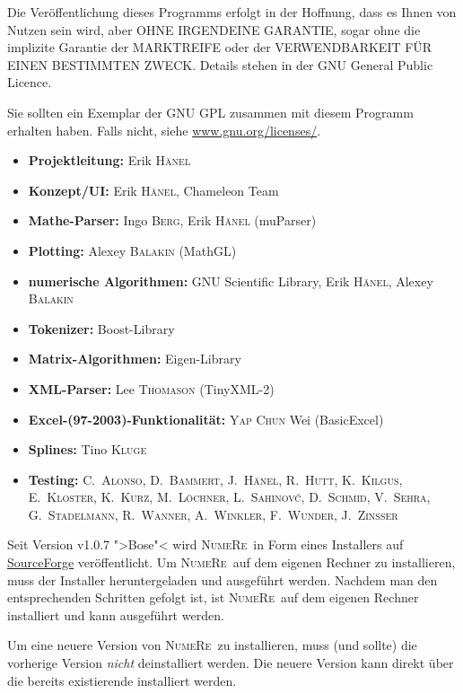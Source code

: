 \documentclass[DIV=14,headsepline,footsepline]{scrbook}
\newcommand{\NR}{\textsc{Nu\-me\-Re}}
\begin{document}
			Die Veröffentlichung dieses Programms erfolgt in der Hoffnung, dass es Ihnen von Nutzen sein wird, aber OHNE IRGENDEINE GARANTIE, sogar ohne die implizite Garantie der MARKTREIFE oder der VERWENDBARKEIT FÜR EINEN BESTIMMTEN ZWECK. Details stehen in der GNU General Public Licence.
			
			Sie sollten ein Exemplar der GNU GPL zusammen mit diesem Programm erhalten haben. Falls nicht, siehe \href{http://www.gnu.org/licenses/}{www.gnu.org/licenses/}.
			\begin{itemize}
				\item \textbf{Projektleitung:} Erik \textsc{Hänel}
				\item \textbf{Konzept/UI:} Erik \textsc{Hänel}, Chameleon Team
				\item \textbf{Mathe-Parser:} Ingo \textsc{Berg}, Erik \textsc{Hänel} (muParser)
				\item \textbf{Plotting:} Alexey \textsc{Balakin} (MathGL)
				\item \textbf{numerische Algorithmen:} GNU Scientific Library, Erik \textsc{Hänel}, Alexey \textsc{Balakin}
				\item \textbf{Tokenizer:} Boost-Library
				\item \textbf{Matrix-Algorithmen:} Eigen-Library
				\item \textbf{XML-Parser:} Lee \textsc{Thomason} (TinyXML-2)
				\item \textbf{Excel-(97-2003)-Funktionalität:} \textsc{Yap Chun} Wei (BasicExcel)
				\item \textbf{Splines:} Tino \textsc{Kluge}
				\item \textbf{Testing:} C.~\textsc{Alonso}, D.~\textsc{Bammert}, J.~\textsc{Hänel}, R.~\textsc{Hutt}, K.~\textsc{Kilgus}, E.~\textsc{Kloster}, K.~\textsc{Kurz}, M.~\textsc{Löchner}, L.~\textsc{Sahinov\'c}, D.~\textsc{Schmid}, V.~\textsc{Sehra}, G.~\textsc{Stadelmann}, R.~\textsc{Wanner}, A.~\textsc{Winkler}, F.~\textsc{Wunder}, J.~\textsc{Zinßer}
			\end{itemize}
		Seit Version v1.0.7 ">Bose"< wird \NR\ in Form eines Installers auf \href{https://sourceforge.net/projects/numere/files/latest/download}{SourceForge} veröffentlicht. Um \NR\ auf dem eigenen Rechner zu installieren, muss der Installer heruntergeladen und ausgeführt werden. Nachdem man den entsprechenden Schritten gefolgt ist, ist \NR\ auf dem eigenen Rechner installiert und kann ausgeführt werden.
		
		Um eine neuere Version von \NR\ zu installieren, muss (und sollte) die vorherige Version \emph{nicht} deinstalliert werden. Die neuere Version kann direkt über die bereits existierende installiert werden.
\end{document}
